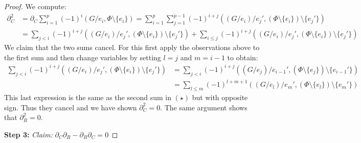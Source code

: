 \begin{proof}
	We compute:
	\begin{align*}
		\partial_{C}^2 &= \partial_{C} \sum_{i=1}^{p} (-1)^{i}(G / e_{i}, \Phi \setminus \{e_{i}\})
		=  \sum_{i=1}^{p} \sum_{j=1}^{p-1} (-1)^{i+j}((G / e_{i}) / e_{j}', (\Phi \setminus \{e_{i}\} ) \setminus \{e_{j}'\})  \\
					   &= \sum_{j < i} (-1)^{i+j} ((G / e_{i}) / e_{j}', (\Phi \setminus \{e_{i}\} ) \setminus \{e_{j}'\}) + \sum_{i \leq j} (-1)^{i+j}
					   ((G / e_{i}) / e_{j}', (\Phi \setminus \{e_{i}\} ) \setminus \{e_{j}'\}) \tag{$\star$}
	\end{align*}
	We claim that the two sums cancel. For this first apply the observations above to the first sum and then change variables by setting $l = j$ and  $m = i-1$ to obtain:
	\begin{align*}
		\sum_{j < i} (-1)^{i+j} ((G / e_{i}) / e_{j}', (\Phi \setminus \{e_{i}\}) \setminus \{e_{j}'\} ) &= 
		\sum_{j < i} (-1)^{i+j}((G / e_{j}) / e_{i-1}', (\Phi \setminus \{e_{j}\}) \setminus \{e_{i-1}'\} ) \\ 
		&= \sum_{l \leq m} (-1)^{l+m+1} ((G / e_{l}) / e_{m}', (\Phi \setminus \{e_{l}\}) \setminus \{e_{m}'\} ) 
	\end{align*}
	This last expression is the same as the second sum in $(\star)$ but with opposite sign. Thus they cancel and we have shown $\partial_{C}^2 = 0$.
	The same argument shows that $\partial_{R}^2 = 0$.

	\textbf{Step 3:} \emph{Claim:} $\partial_{C} \partial_{R} - \partial_{R} \partial_{C} = 0$


\end{proof}
